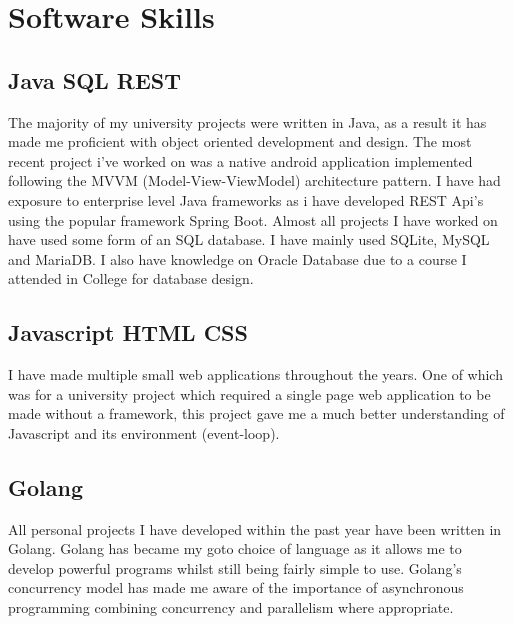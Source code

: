 \documentclass[a4paper]{cv}
\begin{document}
\begin{minipage}[t]{0.33\textwidth}

\section{Software Skills} 
\subsection{Java \textbullet{} SQL \textbullet{} REST}
\begin{flushleft}
The majority of my university projects were written in Java, as a result it has made me proficient with object oriented development and design. The most recent project i've worked on was a native android application implemented following the MVVM (Model-View-ViewModel) architecture pattern.
I have had exposure to enterprise level Java frameworks as i have developed REST Api's using the popular framework Spring Boot.
Almost all projects I have worked on have used some form of an SQL database. I have mainly used SQLite, MySQL and MariaDB. I also have knowledge on Oracle Database due to a course I attended in College for database design.
\end{flushleft}

\sectionspace
\subsection{Javascript \textbullet{} HTML \textbullet{} CSS}
\begin{flushleft}
I have made multiple small web applications throughout the years. One of which was for a university project which required a single page web application to be made without a framework, this project gave me a much better understanding of Javascript and its environment (event-loop).
\end{flushleft}
\sectionspace
\subsection{Golang}
\begin{flushleft}
All personal projects I have developed within the past year have been written in Golang. Golang has became my goto choice of language as it allows me to develop powerful programs whilst still being fairly simple to use. Golang's concurrency model has made me aware of the importance of asynchronous programming combining concurrency and parallelism where appropriate.
\end{flushleft}

\end{minipage}
\end{document}
